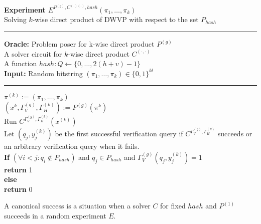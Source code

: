 \begin{codeblock}
  \textbf{Experiment $E^{P^{(g)}, C^{(.)(.)}, hash}(\pi_1, \dots, \pi_k)$} \\
  Solving $k$-wise direct product of DWVP with respect to the set $P_{hash}$
  \medskip

  \hrule

  \medskip
  \textbf{Oracle:} Problem poser for k-wise direct product $P^{(g)}$ \\
  \IndI A solver circuit for $k$-wise direct product $C^{(\cdot, \cdot)}$ \\
  \IndI A function $hash: Q \leftarrow \{0, \dots, 2(h+v) - 1\}$\\
  \textbf{Input:} Random bitstring $(\pi_1, \dots, \pi_k) \in \{0,1\}^{kl}$\\

  \medskip\hrule\medskip

  $\pi^{(k)} := \left(\pi_1, \dots, \pi_k \right)$\\
  $(x^{k}, \Gamma_V^{(g)}, \Gamma_H^{(k)}) := P^{(g)}(\pi^{k})$\\
  Run $C^{\Gamma_V^{(g)}, \Gamma_H^{(k)}} (x^{(k)})$ \\
  \IndI Let $(q_j,y_j^{(k)})$ be the first successful verification query if $C^{\Gamma_V^{(g)}, \Gamma_H^{(k)}}$ succeeds or \\
  \IndI an arbitrary verification query when it fails.\\
  \textbf{If} $(\forall i < j :  q_i \notin P_{hash} )$ and $q_j \in P_{hash}$ and $\Gamma_V^{(g)}(q_j, y_j^{(k)}) = 1$ \\
  \IndI \textbf{return} 1\\
  \textbf{else}\\
  \IndI \textbf{return} 0\\
\end{codeblock}
%
A canonical success is a situation when a solver $C$ for fixed $hash$ and $P^{(1)}$ succeeds in a random experiment $E$.
%
